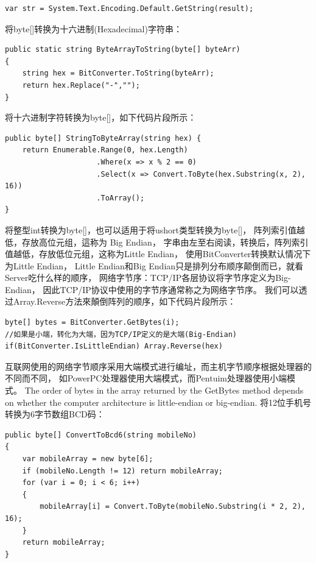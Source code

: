 \documentclass{book}
\begin{document}
\begin{lstlisting}[language={[Sharp]C}]
var str = System.Text.Encoding.Default.GetString(result);
\end{lstlisting}

将byte[]转换为十六进制(Hexadecimal)字符串：

\begin{lstlisting}[language={[Sharp]C}]
public static string ByteArrayToString(byte[] byteArr)
{
	string hex = BitConverter.ToString(byteArr);
	return hex.Replace("-","");
}
\end{lstlisting}

将十六进制字符转换为byte[]，如下代码片段所示：

\begin{lstlisting}[language={[Sharp]C}]
public byte[] StringToByteArray(string hex) {
	return Enumerable.Range(0, hex.Length)
					 .Where(x => x % 2 == 0)
					 .Select(x => Convert.ToByte(hex.Substring(x, 2), 16))
					 .ToArray();
}
\end{lstlisting}

将整型int转换为byte[]，也可以适用于将ushort类型转换为byte[]，
阵列索引值越低，存放高位元组，這称为 Big Endian，
字串由左至右阅读，转换后，阵列索引值越低，存放低位元组，这称为Little Endian，
使用BitConverter转换默认情况下为Little Endian，
Little Endian和Big Endian只是排列分布顺序颠倒而已，就看Server吃什么样的顺序，
网络字节序：TCP/IP各层协议将字节序定义为Big-Endian，
因此TCP/IP协议中使用的字节序通常称之为网络字节序。
我们可以透过Array.Reverse方法來顛倒阵列的顺序，如下代码片段所示：

\begin{lstlisting}[language={[Sharp]C}]
byte[] bytes = BitConverter.GetBytes(i);
//如果是小端，转化为大端，因为TCP/IP定义的是大端(Big-Endian)
if(BitConverter.IsLittleEndian) Array.Reverse(hex)
\end{lstlisting}

互联网使用的网络字节顺序采用大端模式进行编址，而主机字节顺序根据处理器的不同而不同，
如PowerPC处理器使用大端模式，而Pentuim处理器使用小端模式。
The order of bytes in the array returned by the GetBytes method depends on whether the computer architecture is little-endian or big-endian.
将12位手机号转换为6字节数组BCD码：

\begin{lstlisting}[language={[Sharp]C}]
public byte[] ConvertToBcd6(string mobileNo)
{
	var mobileArray = new byte[6];
	if (mobileNo.Length != 12) return mobileArray;
	for (var i = 0; i < 6; i++)
	{
		mobileArray[i] = Convert.ToByte(mobileNo.Substring(i * 2, 2), 16);
	}
	return mobileArray;
}  
\end{lstlisting}
\end{document}

